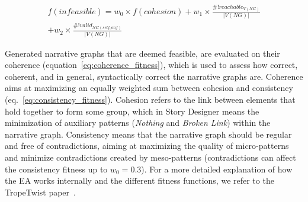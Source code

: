 
\begin{multline}
\label{eq:inf_fitness}
f(infeasible) = w_{0} \times f(cohesion) + w_{1} \times \frac{\#!reachable_{V(NG)}}{|V(NG)|} 
\\ + w_{2} \times  \frac{\#!valid_{NG(self_conf)}}{|V(NG)|}
\end{multline}

Generated narrative graphs that are deemed feasible, are evaluated on their coherence (equation~\ref{eq:coherence_fitness}), which is used to assess how correct, coherent, and in general, syntactically correct the narrative graphs are. Coherence aims at maximizing an equally weighted sum between cohesion and consistency (eq.~\ref{eq:consistency_fitness}). Cohesion refers to the link between elements that hold together to form some group, which in Story Designer means the minimization of auxiliary patterns (\textit{Nothing} and \textit{Broken Link}) within the narrative graph. Consistency means that the narrative graph should be regular and free of contradictions, aiming at maximizing the quality of micro-patterns and minimize contradictions created by meso-patterns (contradictions can affect the consistency fitness up to $w_{0}=0.3$). For a more detailed explanation of how the EA works internally and the different fitness functions, we refer to the TropeTwist paper~.



